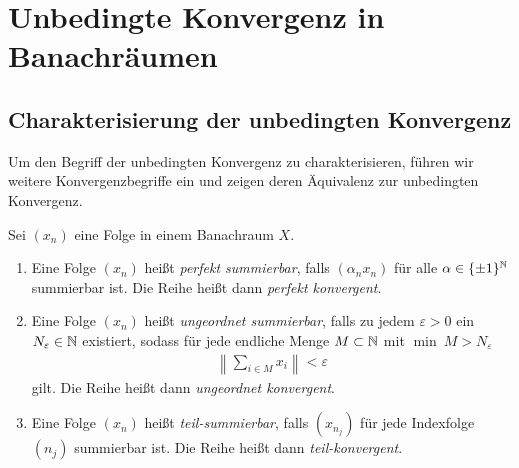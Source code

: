 
\chapter{Unbedingte Konvergenz in Banachräumen}


\section{Charakterisierung der unbedingten Konvergenz}\label{sc:char_uncon_sum}





Um den Begriff der unbedingten Konvergenz zu charakterisieren, führen wir weitere Konvergenzbegriffe ein und zeigen deren Äquivalenz zur unbedingten Konvergenz.

\begin{df}
	Sei $ (x_n) $ eine Folge in einem Banachraum $ X $.
	\begin{enumerate}
	\item 
	Eine Folge $ (x_n) $ heißt \textit{perfekt summierbar}, falls
	$ (\alpha_n x_n ) $ für alle $ \alpha \in \{\pm 1\}^{\mathbb{N}} $ summierbar ist.
	Die Reihe heißt dann \textit{perfekt konvergent}.
	
	\item
	Eine Folge $ (x_n) $ heißt \textit{ungeordnet summierbar}, falls zu jedem 
	$ \varepsilon >0  $ ein $ N_\varepsilon  \in \mathbb{N}$ existiert, sodass für jede endliche Menge $ M \subset \mathbb{N} $ mit $ \min \ M > N_\varepsilon $
	\begin{align*}
		\left\| \sum \limits_{i \in M } x_i \right\| < \varepsilon
	\end{align*}
	gilt.
	Die Reihe heißt dann \textit{ungeordnet konvergent}.
	
	\item
	Eine Folge $ (x_n) $ heißt \textit{teil-summierbar}, falls $ (x_{n_j}) $
	für jede Indexfolge $ (n_j) $ summierbar ist.
	Die Reihe heißt dann \textit{teil-konvergent}.\\
\end{enumerate}
\end{df}


